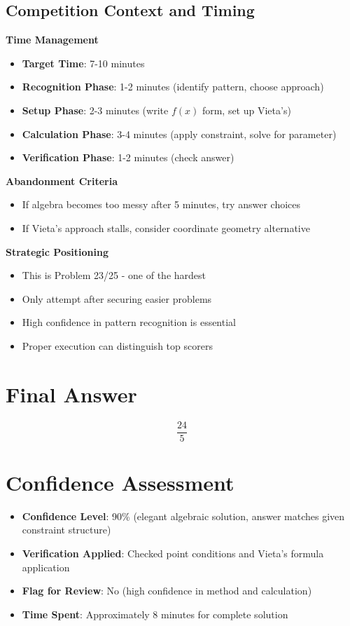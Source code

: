 \documentclass[]{article}
\begin{document}
\begin{competitionbox}
\subsection*{Competition Context and Timing}

\textbf{Time Management}
\begin{itemize}[leftmargin=*]
    \item \textbf{Target Time}: 7-10 minutes
    \item \textbf{Recognition Phase}: 1-2 minutes (identify pattern, choose approach)
    \item \textbf{Setup Phase}: 2-3 minutes (write $f(x)$ form, set up Vieta's)
    \item \textbf{Calculation Phase}: 3-4 minutes (apply constraint, solve for parameter)
    \item \textbf{Verification Phase}: 1-2 minutes (check answer)
\end{itemize}

\textbf{Abandonment Criteria}
\begin{itemize}[leftmargin=*]
    \item If algebra becomes too messy after 5 minutes, try answer choices
    \item If Vieta's approach stalls, consider coordinate geometry alternative
\end{itemize}

\textbf{Strategic Positioning}
\begin{itemize}[leftmargin=*]
    \item This is Problem 23/25 - one of the hardest
    \item Only attempt after securing easier problems
    \item High confidence in pattern recognition is essential
    \item Proper execution can distinguish top scorers
\end{itemize}
\end{competitionbox}

\section*{Final Answer}
\[\boxed{\frac{24}{5}}\]

\section*{Confidence Assessment}
\begin{itemize}[leftmargin=*]
    \item \textbf{Confidence Level}: 90\% (elegant algebraic solution, answer matches given constraint structure)
    \item \textbf{Verification Applied}: Checked point conditions and Vieta's formula application
    \item \textbf{Flag for Review}: No (high confidence in method and calculation)
    \item \textbf{Time Spent}: Approximately 8 minutes for complete solution
\end{itemize}
\end{document}
